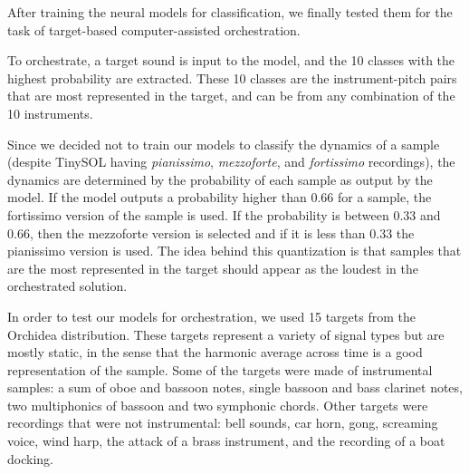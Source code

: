 \documentclass[runningheads,a4paper]{llncs}
\begin{document}
After training the neural models for classification, we finally tested them for the task of target-based computer-assisted orchestration. 

To orchestrate, a target sound is input to the model, and the 10 classes with the highest probability are extracted. These 10 classes are the instrument-pitch pairs that are most represented in the target, and can be from any combination of the 10 instruments. 

Since we decided not to train our models to classify the dynamics of a sample (despite TinySOL having \emph{pianissimo}, \emph{mezzoforte}, and \emph{fortissimo} recordings), the dynamics are determined by the probability of each sample as output by the model. If the model outputs a probability higher than $0.66$ for a sample, the fortissimo version of the sample is used. If the probability is between $0.33$ and $0.66$, then the mezzoforte version is selected and if it is less than $0.33$ the pianissimo version is used. The idea behind this quantization is that samples that are the most represented in the target should appear as the loudest in the orchestrated solution.

In order to test our models for orchestration, we used 15 targets from the Orchidea distribution. These targets represent a variety of signal types but are mostly static, in the sense that the harmonic average across time is a good representation of the sample. Some of the targets were made of instrumental samples: a sum of oboe and bassoon notes, single bassoon and bass clarinet notes, two multiphonics of bassoon and two symphonic chords. Other targets were recordings that were not instrumental: bell sounds, car horn, gong, screaming voice, wind harp, the attack of a brass instrument, and the recording of a boat docking.
\end{document}
